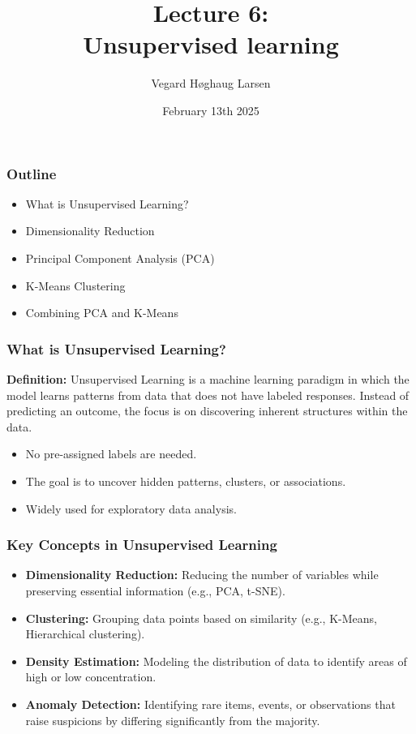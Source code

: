 \documentclass[aspectratio=169]{beamer}
\title{Lecture 6:\\ Unsupervised learning}
\institute{GRA4160: Predictive modelling with machine learning}
\date{February 13th 2025}
\author{Vegard H\o ghaug Larsen}
\begin{document}
\maketitle

\begin{frame}
\frametitle{Outline}
\begin{itemize}
    \item What is Unsupervised Learning?
    \item Dimensionality Reduction
    \item Principal Component Analysis (PCA)
    \item K-Means Clustering
    \item Combining PCA and K-Means
\end{itemize}
\end{frame}

\begin{frame}
    \frametitle{What is Unsupervised Learning?}
    \textbf{Definition:} Unsupervised Learning is a machine learning paradigm in which the model learns patterns from data that does not have labeled responses. Instead of predicting an outcome, the focus is on discovering inherent structures within the data.

    \vspace{0.5cm}
    \begin{itemize}
        \item No pre-assigned labels are needed.
        \item The goal is to uncover hidden patterns, clusters, or associations.
        \item Widely used for exploratory data analysis.
    \end{itemize}
\end{frame}

\begin{frame}
    \frametitle{Key Concepts in Unsupervised Learning}
    \begin{itemize}
        \item \textbf{Dimensionality Reduction:} Reducing the number of variables while preserving essential information (e.g., PCA, t-SNE).
        \item \textbf{Clustering:} Grouping data points based on similarity (e.g., K-Means, Hierarchical clustering).
        \item \textbf{Density Estimation:} Modeling the distribution of data to identify areas of high or low concentration.
        \item \textbf{Anomaly Detection:} Identifying rare items, events, or observations that raise suspicions by differing significantly from the majority.
    \end{itemize}
\end{frame}
\end{document}
